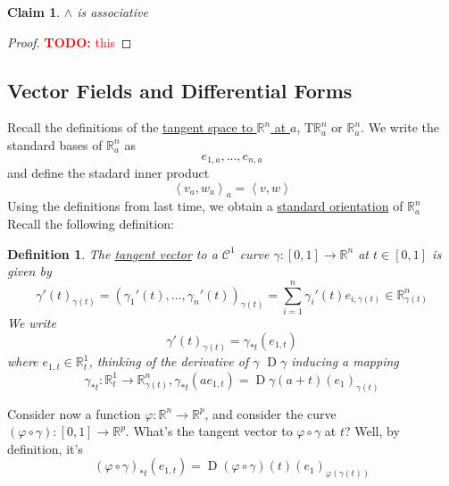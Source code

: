 \documentclass{article}
\newtheorem{definition}{Definition}
\newtheorem{claim}{Claim}
\DeclareMathOperator{\D}{D}
\newcommand{\reals}[0]{\mathbb{R}}
\newcommand{\mc}[1]{\mathcal{#1}}
\newcommand{\ip}[2]{\left\langle#1,#2\right\rangle}
\newcommand{\TODO}[1]{\textcolor{red}{\textbf{TODO:} #1}}
\begin{document}
\begin{claim}
  \(\wedge\) is associative
\end{claim}
\begin{proof}
  \TODO{this}
\end{proof}



\subsection{Vector Fields and Differential Forms}


Recall the definitions of the \underline{tangent space to \(\reals^n\) at \(a\)}, \(\text{T}\reals^n_a\) or \(\reals^n_a\). We write the standard bases of \(\reals^n_a\) as
\begin{equation}
  e_{1,a},...,e_{n,a}
\end{equation}
and define the stadard inner product
\begin{equation}
  \ip{v_a}{w_a}_a = \ip{v}{w}
\end{equation}
Using the definitions from last time, we obtain a \underline{standard orientation} of \(\reals^n_a\)
\begin{equation}
  [e_{1,a},...,e_{n,a}]
\end{equation}
Recall the following definition:
\begin{definition}
  The \underline{tangent vector} to a \(\mc{C}^1\) curve \(\gamma: [0, 1] \to \reals^n\) at \(t \in [0, 1]\) is given by
  \begin{equation}
    \gamma'(t)_{\gamma(t)} = (\gamma_1'(t),...,\gamma_n'(t))_{\gamma(t)} = \sum_{i = 1}^n\gamma_i'(t)e_{i, \gamma(t)} \in \reals^n_{\gamma(t)}
  \end{equation}
  We write
  \begin{equation}
    \gamma'(t)_{\gamma(t)} = \gamma_{*t}(e_{1, t})
  \end{equation}
  where \(e_{1, t} \in \reals^1_t\), thinking of the derivative of \(\gamma\) \(\D\gamma\) inducing a mapping
  \begin{equation}
    \gamma_{*t}: \reals_t^1 \to \reals^n_{\gamma(t)}, \gamma_{*t}(ae_{1, t}) = \D\gamma(a + t)(e_1)_{\gamma(t)}
  \end{equation}
\end{definition}
Consider now a function \(\varphi : \reals^n \to \reals^p\), and consider the curve \((\varphi \circ \gamma): [0, 1] \to \reals^p\). What's the tangent vector to \(\varphi \circ \gamma\) at \(t\)? Well, by definition, it's
\begin{equation}
  (\varphi \circ \gamma)_{*t}(e_{1, t}) = \D(\varphi \circ \gamma)(t)(e_1)_{\varphi(\gamma(t))} \label{starphi}
\end{equation}
\end{document}
